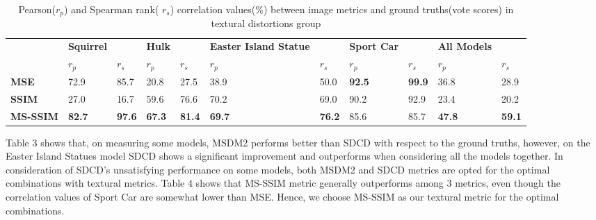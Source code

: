 \begin{table}[]
\centering
\caption{Pearson($r_p$) and Spearman rank( $r_s$) correlation values(\%) between image metrics and ground truths(vote scores) in textural distortions group}
\label{my-label}
\begin{tabular}{lllllllllll}
                & \textbf{Squirrel} & \textbf{} & \textbf{Hulk} & \textbf{} & \textbf{Easter Island Statue} & \textbf{} & \textbf{Sport Car} & \textbf{} & \textbf{All Models} &      \\
                & $r_p$        & $r_s$        & $r_p$            & $r_s$        & $r_p$               & $r_s$        & $r_p$                & $r_s$       & $r_p$                  & $r_s$   \\
\textbf{MSE}    & 72.9              & 85.7          & 20.8  & 27.5          & 38.9                          & 50.0          & \textbf{92.5}      & \textbf{99.9} & 36.8                & 28.9          \\
\textbf{SSIM} \cite{Wang_2004}  & 27.0              & 16.7          & 59.6          & 76.6          & 70.2                          & 69.0          & 90.2               & 92.9          & 23.4                & 20.2          \\
\textbf{MS-SSIM} \cite{Wang} & \textbf{82.7}     & \textbf{97.6} & \textbf{67.3}          & \textbf{81.4} & \textbf{69.7}                 & \textbf{76.2} & 85.6               & 85.7          & \textbf{47.8}       & \textbf{59.1}
\end{tabular}
\end{table}
Table 3 shows that, on measuring some models, MSDM2 performs better than SDCD with respect to the ground truths, however, on the Easter Island Statues model SDCD shows a significant improvement and outperforms when considering all the models together. In consideration of SDCD’s unsatisfying performance on some models, both MSDM2 and SDCD metrics are opted for the optimal combinations with textural metrics. Table 4 shows that MS-SSIM metric generally outperforms among 3 metrics, even though the correlation values of Sport Car are somewhat lower than MSE.  Hence, we choose MS-SSIM as our textural metric for the optimal combinations.\\
